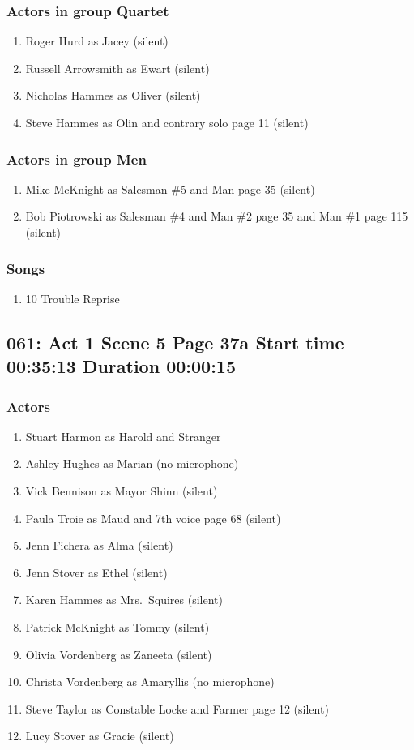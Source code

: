 \subsubsection{Actors in group Quartet}
\begin{enumerate}
\item Roger Hurd as Jacey (silent)
\item Russell Arrowsmith as Ewart (silent)
\item Nicholas Hammes as Oliver (silent)
\item Steve Hammes as Olin and contrary solo page 11 (silent)
\end{enumerate}
\subsubsection{Actors in group Men}
\begin{enumerate}
\item Mike McKnight as Salesman \#5 and Man page 35 (silent)
\item Bob Piotrowski as Salesman \#4 and Man \#2 page 35 and Man \#1 page 115 (silent)
\end{enumerate}

\subsubsection{Songs}
\begin{enumerate}
\item 10 Trouble Reprise
\end{enumerate}
\subsection{061: Act 1 Scene 5 Page 37a Start time 00:35:13 Duration 00:00:15}

\subsubsection{Actors}
\begin{enumerate}
\item Stuart Harmon as Harold and Stranger
\item Ashley Hughes as Marian (no microphone)
\item Vick Bennison as Mayor Shinn (silent)
\item Paula Troie as Maud and 7th voice page 68 (silent)
\item Jenn Fichera as Alma (silent)
\item Jenn Stover as Ethel (silent)
\item Karen Hammes as Mrs.~Squires (silent)
\item Patrick McKnight as Tommy (silent)
\item Olivia Vordenberg as Zaneeta (silent)
\item Christa Vordenberg as Amaryllis (no microphone)
\item Steve Taylor as Constable Locke and Farmer page 12 (silent)
\item Lucy Stover as Gracie (silent)
\end{enumerate}
